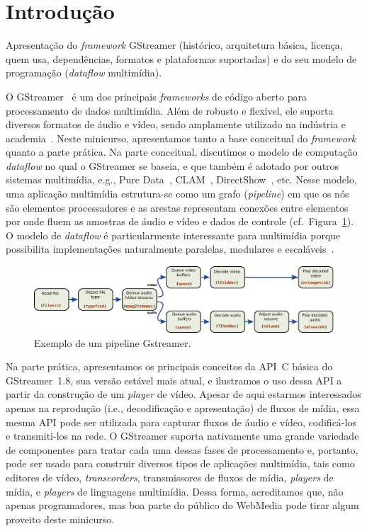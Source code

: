 \documentclass{SBCbookchapter}
\begin{document}

\section{Introdução}
Apresentação do \emph{framework} GStreamer (histórico, arquitetura básica,
licença, quem usa, dependências, formatos e plataformas suportadas) e do seu
modelo de programação (\emph{dataflow} multimídia).

O GStreamer~\cite{gstreamer} é um dos principais \emph{frameworks} de código
aberto para processamento de dados multimídia.  Além de robusto e flexível,
ele suporta diversos formatos de áudio e vídeo, sendo amplamente utilizado
na indústria e academia~\cite{gstreamer-apps}.  Neste minicurso,
apresentamos tanto a base conceitual do \emph{framework} quanto a parte
prática.  Na parte conceitual, discutimos o modelo de computação
\emph{dataflow} no qual o GStreamer se baseia, e que também é adotado por
outros sistemas multimídia, e.g., Pure Data~\cite{Puckette-M-S-2007},
CLAM~\cite{Amatriain-X-2008}, DirectShow~\cite{Chatterjee-A-1997}, etc.
Nesse modelo, uma aplicação multimídia estrutura-se como um grafo
(\emph{pipeline}) em que os nós são elementos processadores e as arestas
representam conexões entre elementos por onde fluem as amostras de áudio e
vídeo e dados de controle (cf.~Figura~\ref{fig:pipeline}).  O modelo de
\emph{dataflow} é particularmente interessante para multimídia porque
possibilita implementações naturalmente paralelas, modulares e
escaláveis~\cite{Yviquel-H-2014}.

\begin{figure}[ht!]
  \label{fig:pipeline}
  \includegraphics[width=\textwidth]{gstreamer_pipeline.pdf}
  \caption{Exemplo de um pipeline Gstreamer.}
\end{figure}

Na parte prática, apresentamos os principais conceitos da API~C básica do
GStreamer~1.8, sua versão estável mais atual, e ilustramos o uso dessa API a
partir da construção de um \emph{player} de vídeo.  Apesar de aqui estarmos
interessados apenas na reprodução (i.e., decodificação e apresentação) de
fluxos de mídia, essa mesma API pode ser utilizada para capturar fluxos de
áudio e vídeo, codificá-los e transmiti-los na rede.  O GStreamer suporta
nativamente uma grande variedade de componentes para tratar cada uma dessas
fases de processamento e, portanto, pode ser usado para construir diversos
tipos de aplicações multimídia, tais como editores de vídeo,
\emph{transcorders}, transmissores de fluxos de mídia, \emph{players} de
mídia, e \emph{players} de linguagens multimídia.  Dessa forma, acreditamos
que, não apenas programadores, mas boa parte do público do WebMedia pode
tirar algum proveito deste minicurso.
\end{document}
